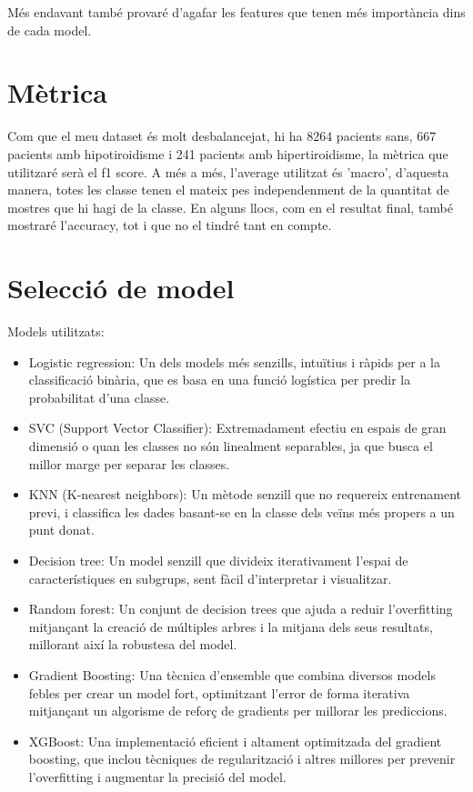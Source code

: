 \documentclass[9pt,a4paper,twoside]{tau-class/tau}
\begin{document}
    Més endavant també provaré d'agafar les features que tenen més importància dins de cada model.

    \section{Mètrica}
    Com que el meu dataset és molt desbalancejat, hi ha 8264 pacients sans, 667 pacients amb hipotiroidisme i 241 pacients amb hipertiroidisme, la mètrica que utilitzaré serà el f1 score. A més a més, l'average utilitzat és 'macro', d'aquesta manera, totes les classe tenen el mateix pes independenment de la quantitat de mostres que hi hagi de la classe.
    En alguns llocs, com en el resultat final, també mostraré l'accuracy, tot i que no el tindré tant en compte.


    \section{Selecció de model}
    Models utilitzats:
    \begin{itemize}
        \item Logistic regression: Un dels models més senzills, intuïtius i ràpids per a la classificació binària, que es basa en una funció logística per predir la probabilitat d'una classe.
        \item SVC (Support Vector Classifier): Extremadament efectiu en espais de gran dimensió o quan les classes no són linealment separables, ja que busca el millor marge per separar les classes.
        \item KNN (K-nearest neighbors): Un mètode senzill que no requereix entrenament previ, i classifica les dades basant-se en la classe dels veïns més propers a un punt donat.
        \item Decision tree: Un model senzill que divideix iterativament l'espai de característiques en subgrups, sent fàcil d'interpretar i visualitzar.
        \item Random forest: Un conjunt de decision trees que ajuda a reduir l'overfitting mitjançant la creació de múltiples arbres i la mitjana dels seus resultats, millorant així la robustesa del model.
        \item Gradient Boosting: Una tècnica d'ensemble que combina diversos models febles per crear un model fort, optimitzant l'error de forma iterativa mitjançant un algorisme de reforç de gradients per millorar les prediccions.
        \item XGBoost: Una implementació eficient i altament optimitzada del gradient boosting, que inclou tècniques de regularització i altres millores per prevenir l'overfitting i augmentar la precisió del model.
    \end{itemize}
\end{document}
